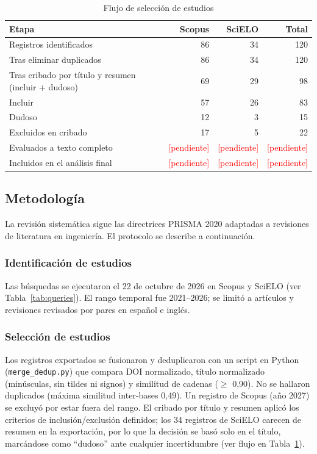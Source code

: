 \documentclass[12pt,a4paper]{article}
\newcommand{\relleno}[1]{\textcolor{red}{[#1]}}
\begin{document}
\begin{table}[ht]
  \centering
  \caption{Flujo de selección de estudios}
  \label{tab:flujo}
  \begin{tabular}{@{}lrrr@{}}
    \toprule
    Etapa & Scopus & SciELO & Total \\
    \midrule
    Registros identificados & 86 & 34 & 120 \\
    Tras eliminar duplicados & 86 & 34 & 120 \\
    Tras cribado por título y resumen (incluir + dudoso) & 69 & 29 & 98 \\
    \quad\quad Incluir & 57 & 26 & 83 \\
    \quad\quad Dudoso & 12 & 3 & 15 \\
    Excluidos en cribado & 17 & 5 & 22 \\
    Evaluados a texto completo & \relleno{pendiente} & \relleno{pendiente} & \relleno{pendiente} \\
    Incluidos en el análisis final & \relleno{pendiente} & \relleno{pendiente} & \relleno{pendiente} \\
    \bottomrule
  \end{tabular}
\end{table}

\subsection{Metodología}
La revisión sistemática sigue las directrices PRISMA 2020 adaptadas a revisiones de literatura en ingeniería. El protocolo se describe a continuación.

\subsubsection{Identificación de estudios}
Las búsquedas se ejecutaron el 22 de octubre de 2026 en Scopus y SciELO (ver Tabla~\ref{tab:queries}). El rango temporal fue 2021--2026; se limitó a artículos y revisiones revisados por pares en español e inglés.

\subsubsection{Selección de estudios}
Los registros exportados se fusionaron y deduplicaron con un script en Python (\texttt{merge\_dedup.py}) que compara DOI normalizado, título normalizado (minúsculas, sin tildes ni signos) y similitud de cadenas ($\ge$ 0,90). No se hallaron duplicados (máxima similitud inter-bases 0,49). Un registro de Scopus (año 2027) se excluyó por estar fuera del rango. El cribado por título y resumen aplicó los criterios de inclusión/exclusión definidos; los 34 registros de SciELO carecen de resumen en la exportación, por lo que la decisión se basó solo en el título, marcándose como ``dudoso'' ante cualquier incertidumbre (ver flujo en Tabla~\ref{tab:flujo}).
\end{document}

